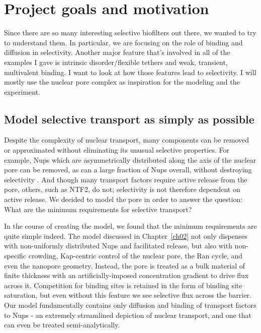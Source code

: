 \section{Project goals and motivation}

Since there are so many interesting selective biofilters out there, we wanted to try to understand them.  In particular, we are focusing on the role of binding and diffusion in selectivity.  Another major feature that's involved in all of the examples I gave is intrinsic disorder/flexible tethers and weak, transient, multivalent binding.  I want to look at how those features lead to selectivity.  I will mostly use the nuclear pore complex as inspiration for the modeling and the experiment.

\subsection{Model selective transport as simply as possible}

Despite the complexity of nuclear transport, many components can be removed or approximated without eliminating its unusual selective properties.   For example, Nups which are asymmetrically distributed along the axis of the nuclear pore can be removed, as can a large fraction of Nups overall, without destroying selectivity \cite{strawn04, zeitler04,kowalczyk11, jovanovic-talisman09}.  And though many transport factors require active release from the pore, others, such as NTF2, do not; selectivity is not therefore dependent on active release.  We decided to model the pore in order to answer the question: What are the minimum requirements for selective transport?

In the course of creating the model, we found that the minimum requirements are quite simple indeed.  The model discussed in Chapter~\ref{ch02} not only dispenses with non-uniformly distributed Nups and facilitated release, but also with non-specific crowding, Kap-centric control of the nuclear pore, the Ran cycle, and even the nanopore geometry.  Instead, the pore is treated as a bulk material of finite thickness with an artificially-imposed concentration gradient to drive flux across it.  Competition for binding sites is retained in the form of binding site saturation, but even without this feature we see selective flux across the barrier.  Our model fundamentally contains only diffusion and binding of transport factors to Nups - an extremely streamlined depiction of nuclear transport, and one that can even be treated semi-analytically.

